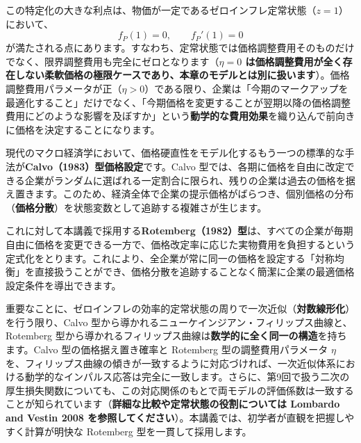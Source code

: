 \documentclass[
  japanese,
  lualatex,
  ja=standard,
  12pt,
  a4paper]{ltjsarticle}
\begin{document}
この特定化の大きな利点は、物価が一定であるゼロインフレ定常状態（\(z=1\)）において、
\[
f_P(1)=0,
\qquad
f_P'(1)=0
\]
が満たされる点にあります。すなわち、定常状態では価格調整費用そのものだけでなく、限界調整費用も完全にゼロとなります（\textbf{\(\eta=0\)
は価格調整費用が全く存在しない柔軟価格の極限ケースであり、本章のモデルとは別に扱います}）。価格調整費用パラメータが正（\(\eta>0\)）である限り、企業は「今期のマークアップを最適化すること」だけでなく、「今期価格を変更することが翌期以降の価格調整費用にどのような影響を及ぼすか」という\textbf{動学的な費用効果}を織り込んで前向きに価格を決定することになります。

\begin{tcolorbox}[enhanced jigsaw, arc=.35mm, bottomrule=.15mm, bottomtitle=1mm, breakable, colback=white, colbacktitle=quarto-callout-note-color!10!white, colframe=quarto-callout-note-color-frame, coltitle=black, left=2mm, leftrule=.75mm, opacityback=0, opacitybacktitle=0.6, rightrule=.15mm, title=\textcolor{quarto-callout-note-color}{\faInfo}\hspace{0.5em}{\textbf{補足：Calvo 型価格硬直性との関係}}, titlerule=0mm, toprule=.15mm, toptitle=1mm]

現代のマクロ経済学において、価格硬直性をモデル化するもう一つの標準的な手法が\textbf{Calvo（1983）型価格設定}です。Calvo
型では、各期に価格を自由に改定できる企業がランダムに選ばれる一定割合に限られ、残りの企業は過去の価格を据え置きます。このため、経済全体で企業の提示価格がばらつき、個別価格の分布（\textbf{価格分散}）を状態変数として追跡する複雑さが生じます。

これに対して本講義で採用する\textbf{Rotemberg（1982）型}は、すべての企業が毎期自由に価格を変更できる一方で、価格改定率に応じた実物費用を負担するという定式化をとります。これにより、全企業が常に同一の価格を設定する「対称均衡」を直接扱うことができ、価格分散を追跡することなく簡潔に企業の最適価格設定条件を導出できます。

重要なことに、ゼロインフレの効率的定常状態の周りで一次近似（\textbf{対数線形化}）を行う限り、Calvo
型から導かれるニューケインジアン・フィリップス曲線と、Rotemberg
型から導かれるフィリップス曲線は\textbf{数学的に全く同一の構造}を持ちます。Calvo
型の価格据え置き確率と Rotemberg 型の調整費用パラメータ \(\eta\)
を、フィリップス曲線の傾きが一致するように対応づければ、一次近似体系における動学的なインパルス応答は完全に一致します。さらに、第9回で扱う二次の厚生損失関数についても、この対応関係のもとで両モデルの評価係数は一致することが知られています（\textbf{詳細な比較や定常状態の役割については
Lombardo and Vestin 2008
を参照してください}）。本講義では、初学者が直観を把握しやすく計算が明快な
Rotemberg 型を一貫して採用します。

\end{tcolorbox}
\end{document}
